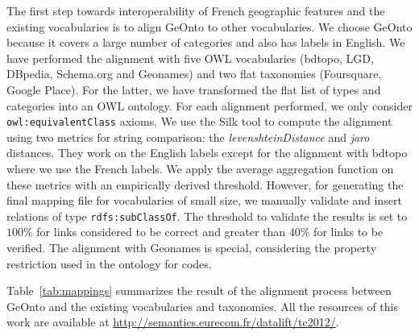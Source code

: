 The first step towards interoperability of French geographic features and the existing vocabularies is to align GeOnto to other vocabularies. We choose GeOnto because it covers a large number of categories and also has labels in English. We have performed the alignment with five OWL vocabularies (bdtopo, LGD, DBpedia, Schema.org and Geonames) and two flat taxonomies (Foursquare, Google Place). For the latter, we have transformed the flat list of types and categories into an OWL ontology. For each alignment performed, we only consider \texttt{owl:equivalentClass} axioms. We use the Silk tool \cite{Julius09} to compute the alignment using two metrics for string comparison: the \textit{levenshteinDistance} and \textit{jaro} distances. They work on the English labels except for the alignment with bdtopo where we use the French labels. We apply the average aggregation function on these metrics with an empirically derived threshold. However, for generating the final mapping file for vocabularies of small size, we manually validate and insert relations of type \texttt{rdfs:subClassOf}. The threshold to validate the results is set to $100$\% for links considered to be correct and greater than $40$\% for links to be verified. The alignment with Geonames is special, considering the property restriction used in the ontology for codes.

Table~\ref{tab:mappings} summarizes the result of the alignment process between GeOnto and the existing vocabularies and taxonomies. All the resources of this work are available at \url{http://semantics.eurecom.fr/datalift/tc2012/}.
\begin{table}
\end{table}

